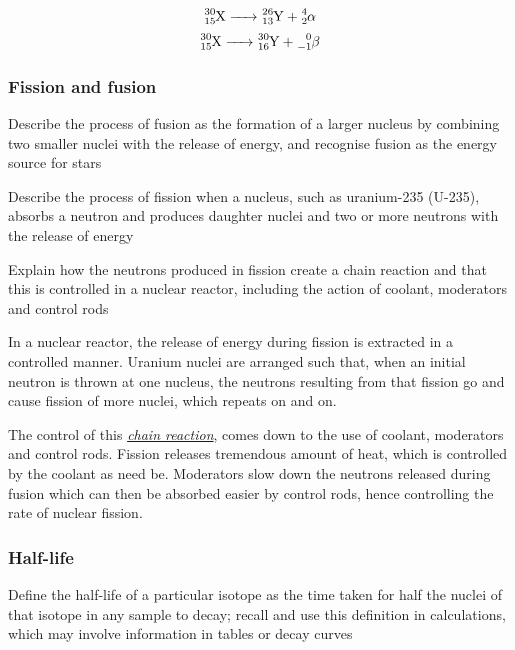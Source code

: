 $$ \ce{ ^{30}_{15}X -> ^{26}_{13}Y + ^4_2\alpha } $$
$$ \ce{ ^{30}_{15}X -> ^{30}_{16}Y + ^0_{-1}\beta } $$

\subsubsection{Fission and fusion}
\begin{subpoint}
Describe the process of fusion as the formation of a larger nucleus by combining two smaller nuclei with
the release of energy, and recognise fusion as the energy source for stars
\end{subpoint}

\begin{subpoint}
Describe the process of fission when a nucleus, such as uranium-235 (U-235), absorbs a neutron and
produces daughter nuclei and two or more neutrons with the release of energy
\end{subpoint}

\begin{subpoint}
Explain how the neutrons produced in fission create a chain reaction and that this is controlled in a nuclear
reactor, including the action of coolant, moderators and control rods
\end{subpoint}

In a nuclear reactor, the release of energy during fission is extracted in a controlled
manner. Uranium nuclei are arranged such that, when an initial neutron is thrown at
one nucleus, the neutrons resulting from that fission go and cause fission of more
nuclei, which repeats on and on.

The control of this \emph{\ul{chain reaction}}, comes down to the use of coolant,
moderators and control rods. Fission releases tremendous amount of heat, which is 
controlled by the coolant as need be. Moderators slow down the neutrons released during
fusion which can then be absorbed easier by control rods, hence controlling the
rate of nuclear fission.

\subsubsection{Half-life}

\begin{subpoint}
Define the half-life of a particular isotope as the time taken for half the nuclei of that isotope in any sample
to decay; recall and use this definition in calculations, which may involve information in tables or decay
curves
\end{subpoint}

